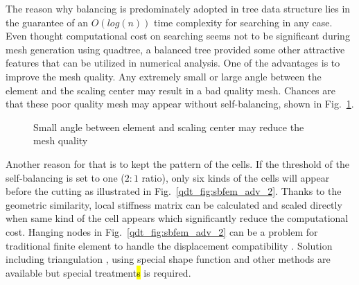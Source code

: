 The reason why balancing is predominately adopted in tree data structure lies in the guarantee of an $O\left(log(n)\right)$ time complexity for searching in any case.
Even thought computational cost on searching seems not to be significant during mesh generation using quadtree, a balanced tree provided some other attractive features that can be utilized in numerical analysis.
One of the advantages is to improve the mesh quality.
Any extremely small or large angle between the element and the scaling center may result in a bad quality mesh.
Chances are that these poor quality mesh may appear without self-balancing, shown in Fig.~\ref{qdt_fig:sbfem_adv_1}.
    \begin{figure}[h!]
        \centering
        \caption{Small angle between element and scaling center may reduce the mesh quality}
        \label{qdt_fig:sbfem_adv_1}
    \end{figure}
%
Another reason for that is to kept the pattern of the cells.
If the threshold of the self-balancing is set to one ($2:1$ ratio), only six kinds of the cells will appear before the cutting as illustrated in Fig.~\ref{qdt_fig:sbfem_adv_2}.
Thanks to the geometric similarity, local stiffness matrix can be calculated and scaled directly when same kind of the cell appears which significantly reduce the computational cost.
Hanging nodes in Fig.~\ref{qdt_fig:sbfem_adv_2} can be a problem for traditional finite element to handle the displacement compatibility \citep{Tabarraei:2009:XFE,NME:NME3070,NME:NME2900}.
Solution including triangulation \citep{4037344,BERN1994384,ijeas251083}, using special shape function \citep{doi:10.1002/nme.1620120104} and other methods are available but special treatment\hl{s} is required.
